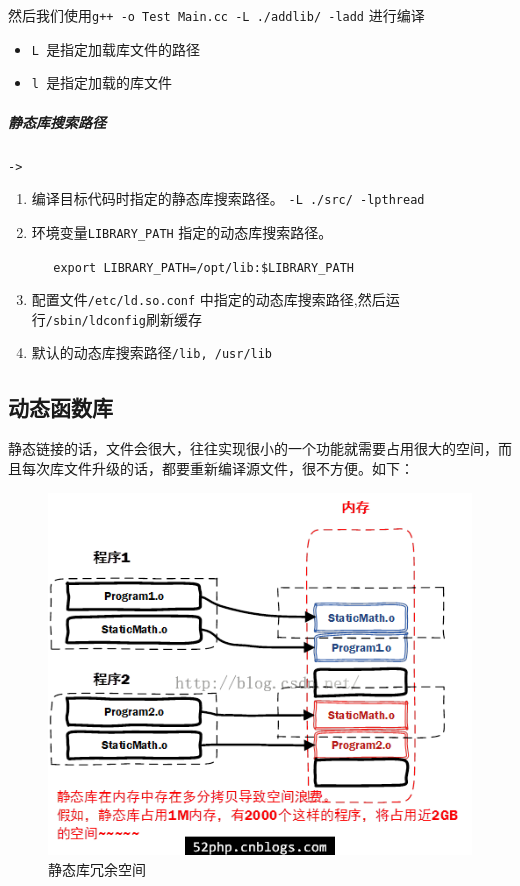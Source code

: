 \documentclass[UTF8,a4paper,12pt]{ctexbook}
\begin{document}
				然后我们使用\verb|g++ -o Test Main.cc -L ./addlib/ -ladd| 进行编译
				
				\begin{itemize}[itemindent = 2em]
					\item \verb|L |是指定加载库文件的路径
					\item \verb|l |是指定加载的库文件
				\end{itemize}
				
			\subparagraph{静态库搜索路径}\verb|->|
			
				\begin{enumerate}[itemindent= 2em]
					\item 编译目标代码时指定的静态库搜索路径。 \verb|-L ./src/ -lpthread|
					\item 环境变量\verb|LIBRARY_PATH| 指定的动态库搜索路径。
					
					 \verb|   export LIBRARY_PATH=/opt/lib:$LIBRARY_PATH|
					\item 配置文件\verb|/etc/ld.so.conf| 中指定的动态库搜索路径,然后运行\verb|/sbin/ldconfig|刷新缓存
					\item 默认的动态库搜索路径\verb|/lib, /usr/lib|
				\end{enumerate}
				
		\subsection{动态函数库}
			静态链接的话，文件会很大，往往实现很小的一个功能就需要占用很大的空间，而且每次库文件升级的话，都要重新编译源文件，很不方便。如下：
			\begin{figure}[h]
				\centering
				\includegraphics[scale = 0.7]{figure/staticLib-disAdvantage.png}
				\caption{静态库冗余空间}
			\end{figure}
			
\end{document}
